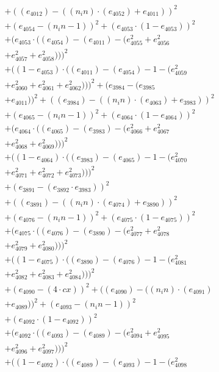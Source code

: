 \documentclass[10pt, a4paper]{article}
\begin{document}
\begin{align*}
& + ((e_{4012}) - ((n_in)  \cdot  (e_{4052}) + e_{4011}))^{2} \\
& + (e_{4054} - (n_in - 1))^{2} + (e_{4053}  \cdot  (1 - e_{4053}))^{2} \\
& + (e_{4053}  \cdot  ((e_{4054}) - (e_{4011}) - (e_{4055}^{2} + e_{4056}^{2} \\
& + e_{4057}^{2} + e_{4058}^{2})))^{2} \\
& + ((1 - e_{4053})  \cdot  ((e_{4011}) - (e_{4054}) - 1 - (e_{4059}^{2} \\
& + e_{4060}^{2} + e_{4061}^{2} + e_{4062}^{2})))^{2} + (e_{3984} - (e_{3985} \\
& + e_{4011}))^{2} + ((e_{3984}) - ((n_in)  \cdot  (e_{4063}) + e_{3983}))^{2} \\
& + (e_{4065} - (n_in - 1))^{2} + (e_{4064}  \cdot  (1 - e_{4064}))^{2} \\
& + (e_{4064}  \cdot  ((e_{4065}) - (e_{3983}) - (e_{4066}^{2} + e_{4067}^{2} \\
& + e_{4068}^{2} + e_{4069}^{2})))^{2} \\
& + ((1 - e_{4064})  \cdot  ((e_{3983}) - (e_{4065}) - 1 - (e_{4070}^{2} \\
& + e_{4071}^{2} + e_{4072}^{2} + e_{4073}^{2})))^{2} \\
& + (e_{3891} - (e_{3892}  \cdot  e_{3983}))^{2} \\
& + ((e_{3891}) - ((n_in)  \cdot  (e_{4074}) + e_{3890}))^{2} \\
& + (e_{4076} - (n_in - 1))^{2} + (e_{4075}  \cdot  (1 - e_{4075}))^{2} \\
& + (e_{4075}  \cdot  ((e_{4076}) - (e_{3890}) - (e_{4077}^{2} + e_{4078}^{2} \\
& + e_{4079}^{2} + e_{4080}^{2})))^{2} \\
& + ((1 - e_{4075})  \cdot  ((e_{3890}) - (e_{4076}) - 1 - (e_{4081}^{2} \\
& + e_{4082}^{2} + e_{4083}^{2} + e_{4084}^{2})))^{2} \\
& + (e_{4090} - (4  \cdot  cx))^{2} + ((e_{4090}) - ((n_in)  \cdot  (e_{4091}) \\
& + e_{4089}))^{2} + (e_{4093} - (n_in - 1))^{2} \\
& + (e_{4092}  \cdot  (1 - e_{4092}))^{2} \\
& + (e_{4092}  \cdot  ((e_{4093}) - (e_{4089}) - (e_{4094}^{2} + e_{4095}^{2} \\
& + e_{4096}^{2} + e_{4097}^{2})))^{2} \\
& + ((1 - e_{4092})  \cdot  ((e_{4089}) - (e_{4093}) - 1 - (e_{4098}^{2} \\

\end{align*}
\end{document}
